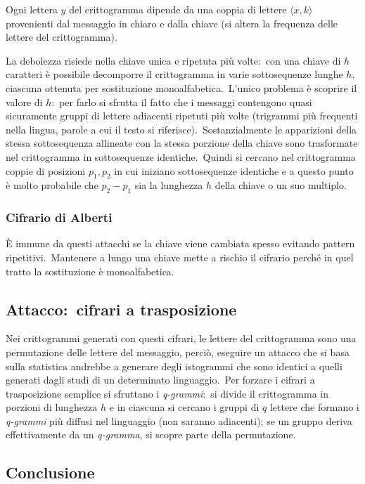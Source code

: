 Ogni lettera $y$ del crittogramma dipende da una coppia di lettere $\langle x, k\rangle$ provenienti dal messaggio in chiaro e dalla chiave (si altera la frequenza delle lettere del crittogramma).\

La debolezza risiede nella chiave unica e ripetuta più volte:\ con una chiave di $h$ caratteri è possibile decomporre il crittogramma in varie sottosequenze lunghe $h$, ciascuna ottenuta per sostituzione monoalfabetica.\
L'unico problema è scoprire il valore di $h$:\ per farlo si sfrutta il fatto che i messaggi contengono quasi sicuramente gruppi di lettere adiacenti ripetuti più volte (trigrammi più frequenti nella lingua, parole a cui il testo si riferisce).\
Sostanzialmente le apparizioni della stessa sottosequenza allineate con la stessa porzione della chiave sono trasformate nel crittogramma in sottosequenze identiche.\
Quindi si cercano nel crittogramma coppie di posizioni $p_1,p_2$ in cui iniziano sottosequenze identiche e a questo punto è molto probabile che $p_2-p_1$ sia la lunghezza $h$ della chiave o un suo multiplo.\

\subsubsection{Cifrario di Alberti}

È immune da questi attacchi se la chiave viene cambiata spesso evitando pattern ripetitivi.\
Mantenere a lungo una chiave mette a rischio il cifrario perché in quel tratto la sostituzione è monoalfabetica.\

\subsection{Attacco:\ cifrari a trasposizione}
Nei crittogrammi generati con questi cifrari, le lettere del crittogramma sono una permutazione delle lettere del messaggio, perciò, eseguire un attacco che si basa sulla statistica andrebbe a generare degli istogrammi che sono identici a quelli generati dagli studi di un determinato linguaggio.\
Per forzare i cifrari a trasposizione semplice si sfruttano i \textit{q-grammi}:\ si divide il crittogramma in porzioni di lunghezza $h$ e in ciascuna si cercano i gruppi di $q$ lettere che formano i \textit{q-grammi} più diffusi nel linguaggio (non saranno adiacenti); se un gruppo deriva effettivamente da un \textit{q-gramma}, si scopre parte della permutazione.

\subsection{Conclusione}

